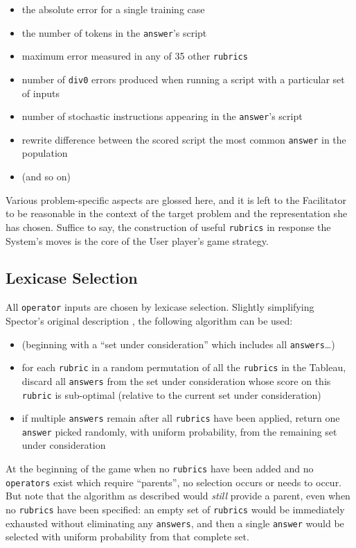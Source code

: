 \begin{itemize}
\item the absolute error for a single training case
\item the number of tokens in the {\tt answer}'s script
\item maximum error measured in any of 35 other {\tt rubrics}
\item number of {\tt div0} errors produced when running a script with a particular set of inputs
\item number of stochastic instructions appearing in the {\tt answer}'s script
\item rewrite difference between the scored script the most common {\tt answer} in the population
\item (and so on)
\end{itemize}

Various problem-specific aspects are glossed here, and it is left to the Facilitator to be reasonable in the context of the target problem and the representation she has chosen. Suffice to say, the construction of useful {\tt rubrics} in response the System's moves is the core of the User player's game strategy.

\subsection{Lexicase Selection}\hypertarget{lexicase-selection}{}\label{lexicase-selection}

All {\tt operator} inputs are chosen by lexicase selection. Slightly simplifying Spector's original description \citep{Spector:2012:GECCOcompA}, the following algorithm can be used:

\begin{itemize}
\item (beginning with a ``set under consideration'' which includes all {\tt answers}\ldots{})
\item for each {\tt rubric} in a random permutation of all the {\tt rubrics} in the Tableau, discard all {\tt answers} from the set under consideration whose score on this {\tt rubric} is sub-optimal (relative to the current set under consideration)
\item if multiple {\tt answers} remain after all {\tt rubrics} have been applied, return one {\tt answer} picked randomly, with uniform probability, from the remaining set under consideration
\end{itemize}

At the beginning of the game when no {\tt rubrics} have been added and no {\tt operators} exist which require ``parents'', no selection occurs or needs to occur. But note that the algorithm as described would \emph{still} provide a parent, even when no {\tt rubrics} have been specified: an empty set of {\tt rubrics} would be immediately exhausted without eliminating any {\tt answers}, and then a single {\tt answer} would be selected with uniform probability from that complete set.

